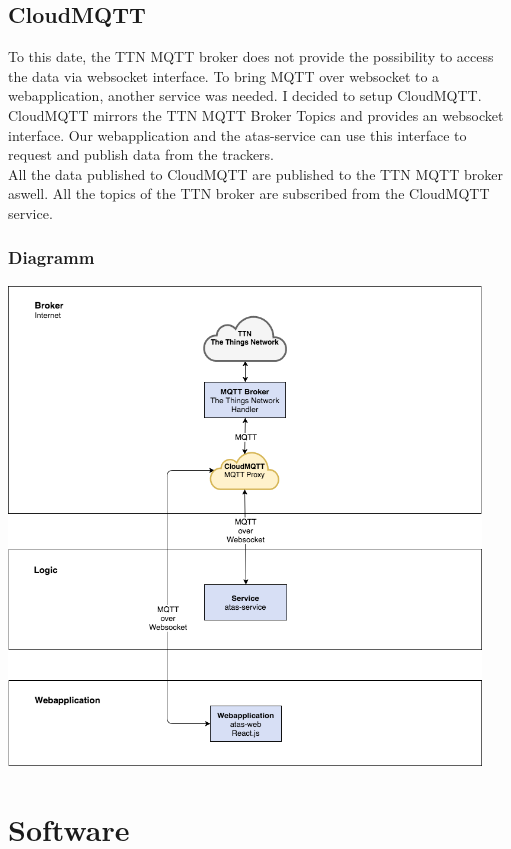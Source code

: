 \documentclass[a4paper,11pt, oneside]{report}
\theoremstyle{definition}
\begin{document}
\newpage
\subsection{CloudMQTT}
To this date, the TTN MQTT broker does not provide the possibility to access the data via websocket interface. To bring MQTT over websocket to a  webapplication, another service was needed. I decided to setup CloudMQTT. \\[0.3cm]
CloudMQTT mirrors the TTN MQTT Broker Topics and provides an websocket interface. Our webapplication and the atas-service can use this interface to request and publish data from the trackers.\\[0.3cm]
All the data published to CloudMQTT are published to the TTN MQTT broker aswell. All the topics of the TTN broker are subscribed from the CloudMQTT service. 

\subsubsection{Diagramm}
\includegraphics[width=0.94\textwidth]{img/ATAS_SystemOverview_Detail_CloudMQTT.png}


\newpage
\section{Software}
\end{document}

